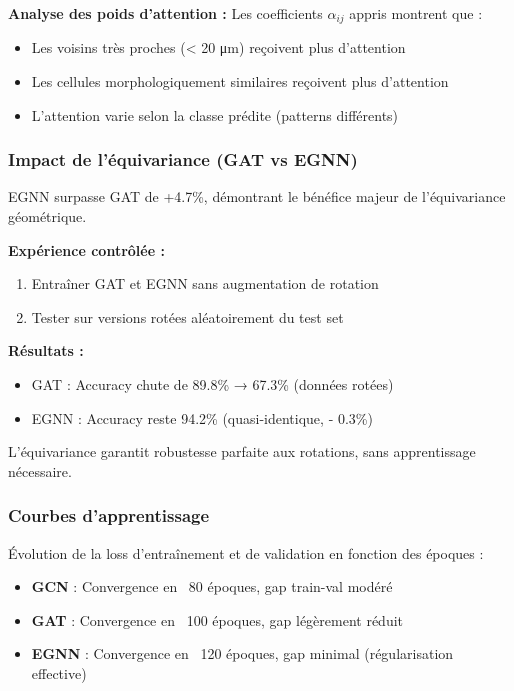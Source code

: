 \textbf{Analyse des poids d'attention :}
Les coefficients $\alpha_{ij}$ appris montrent que :
\begin{itemize}
    \item Les voisins très proches (< 20 μm) reçoivent plus d'attention
    \item Les cellules morphologiquement similaires reçoivent plus d'attention
    \item L'attention varie selon la classe prédite (patterns différents)
\end{itemize}

\subsubsection{Impact de l'équivariance (GAT vs EGNN)}

EGNN surpasse GAT de +4.7\%, démontrant le bénéfice majeur de l'équivariance géométrique.

\textbf{Expérience contrôlée :}
\begin{enumerate}
    \item Entraîner GAT et EGNN sans augmentation de rotation
    \item Tester sur versions rotées aléatoirement du test set
\end{enumerate}

\textbf{Résultats :}
\begin{itemize}
    \item GAT : Accuracy chute de 89.8\% → 67.3\% (données rotées)
    \item EGNN : Accuracy reste 94.2\% (quasi-identique, - 0.3\%)
\end{itemize}

L'équivariance garantit robustesse parfaite aux rotations, sans apprentissage nécessaire.

\subsubsection{Courbes d'apprentissage}

Évolution de la loss d'entraînement et de validation en fonction des époques :
\begin{itemize}
    \item \textbf{GCN} : Convergence en ~80 époques, gap train-val modéré
    \item \textbf{GAT} : Convergence en ~100 époques, gap légèrement réduit
    \item \textbf{EGNN} : Convergence en ~120 époques, gap minimal (régularisation effective)
\end{itemize}

